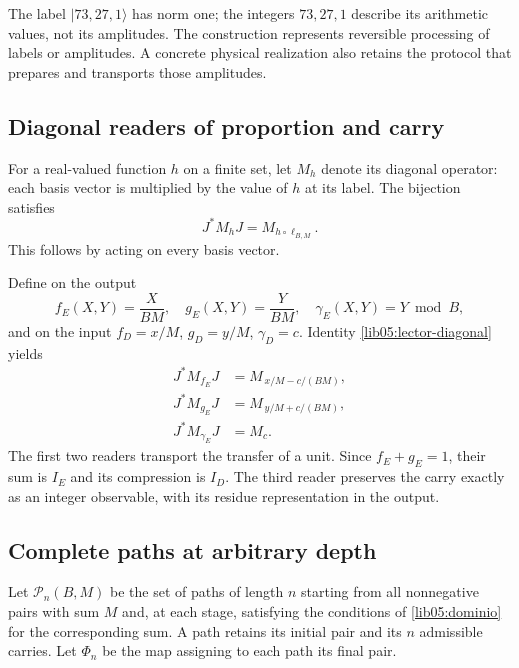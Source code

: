 The label \(|73,27,1\rangle\) has norm one; the integers
\(73,27,1\) describe its arithmetic values, not its amplitudes.
The construction represents reversible processing of labels
or amplitudes. A concrete physical realization also retains
the protocol that prepares and transports those amplitudes.

\subsection{Diagonal readers of proportion and carry}
\label{lib05:diagonales}

For a real-valued function \(h\) on a finite set, let
\(M_h\) denote its diagonal operator: each basis vector is multiplied
by the value of \(h\) at its label. The bijection satisfies
\begin{equation}
 J^*M_hJ=M_{h\circ\ell_{B,M}}.
 \label{lib05:lector-diagonal}
\end{equation}
This follows by acting on every basis vector.

Define on the output
\begin{equation}
 f_E(X,Y)=\frac{X}{BM},\quad
 g_E(X,Y)=\frac{Y}{BM},\quad
 \gamma_E(X,Y)=Y\bmod B,
 \label{lib05:lectores-salida}
\end{equation}
and on the input \(f_D=x/M\), \(g_D=y/M\), \(\gamma_D=c\).
Identity \eqref{lib05:lector-diagonal} yields
\begin{align}
 J^*M_{f_E}J&=M_{\,x/M-c/(BM)},\nonumber\\
 J^*M_{g_E}J&=M_{\,y/M+c/(BM)},\nonumber\\
 J^*M_{\gamma_E}J&=M_c.
 \label{lib05:transporte-fracciones}
\end{align}
The first two readers transport the transfer of a unit.
Since \(f_E+g_E=1\), their sum is \(I_E\) and its compression is
\(I_D\). The third reader preserves the carry exactly as an
integer observable, with its residue representation in the output.

\subsection{Complete paths at arbitrary depth}
\label{lib05:rutas}

Let \(\mathcal P_n(B,M)\) be the set of paths of length \(n\)
starting from all nonnegative pairs with sum \(M\) and, at
each stage, satisfying the conditions of
\eqref{lib05:dominio} for the corresponding sum. A path retains
its initial pair and its \(n\) admissible carries. Let
\(\Phi_n\) be the map assigning to each path its final pair.

